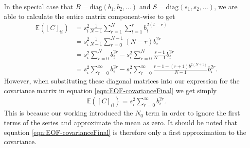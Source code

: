 In the special case that $B = \text{diag}(b_1, b_2, ...)$ and $S = \text{diag}(s_1, s_2, ...)$, we are able to calculate the entire matrix component-wise to get
\begin{align}
\mathbb{E}([C]_{ii}) &= s_i^2\frac{1}{N-1}\sum_{r=1}^{N}\sum_{t=1}^{r} b_i^{2(t-r)}\\
&= s_i^2\frac{1}{N-1}\sum_{r=0}^{N-1}(N-r)b_i^{2r} \\
&= s_i^2\sum_{r=0}^{N}b_i^{2r} - s_i^2\sum_{r=0}^{N}\frac{r-1}{N-1}b_i^{2r}\\
&= s_i^2\sum_{r=0}^{\infty}b_i^{2r} - s_i^2\sum_{r=0}^{\infty}\frac{r-1 - (r+1)b^{2(N+1)}}{N-1}b_i^{2r}.
\end{align}
However, when substituting these diagonal matrices into our expression for the covariance matrix in equation \ref{eqn:EOF-covarianceFinal} we get simply
\begin{align}
\mathbb{E}([C]_{ii}) = s_i^2\sum_{r=0}^\infty b_i^{2r}.
\end{align}
This is because our working introduced the $N_0$ term in order to ignore the first terms of the series and approximate the mean as zero. It should be noted that equation \ref{eqn:EOF-covarianceFinal} is therefore only a first approximation to the covariance. 

